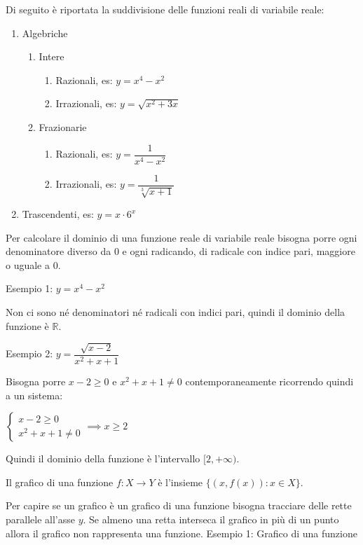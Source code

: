 \documentclass[a4paper]{article}
\theoremstyle{plain}
\theoremstyle{definition}
\theoremstyle{remark}
\newcommand{\R}{\mathbb{R}}
\newcommand{\set}[1]{\{#1\}}
\begin{document}
Di seguito è riportata la suddivisione delle funzioni reali di variabile reale:
\begin{enumerate}
    \item Algebriche
    \begin{enumerate}
        \item Intere
        \begin{enumerate}
            \item Razionali, es: $y=x^4-x^2$
            \item Irrazionali, es: $y=\sqrt{x^2+3x}$
        \end{enumerate}
        \item Frazionarie
        \begin{enumerate}
            \item Razionali, es: $y=\dfrac{1}{x^4-x^2}$
            \item Irrazionali, es: $y=\dfrac{1}{\sqrt[3]{x+1}}$
        \end{enumerate}
    \end{enumerate}
    \item Trascendenti, es: $y=x\cdot 6^x$
\end{enumerate}
Per calcolare il dominio di una funzione reale di variabile reale bisogna porre ogni denominatore diverso da $0$ e ogni radicando, di radicale con indice pari, maggiore o uguale a $0$.

Esempio 1: $y=x^4-x^2$

Non ci sono né denominatori né radicali con indici pari, quindi il dominio della funzione è $\R$.

Esempio 2: $y=\dfrac{\sqrt{x-2}}{x^2+x+1}$

Bisogna porre $x-2\geq0$ e $x^2+x+1\ne0$ contemporaneamente ricorrendo quindi a un sistema:

$\begin{cases}
    x-2\geq0\\
    x^2+x+1\ne0
\end{cases}\implies x\geq2$

Quindi il dominio della funzione è l'intervallo $[2,+\infty)$.

Il grafico di una funzione $f:X\to Y$ è l'insieme $\set{(x,f(x)):x\in X}$.

Per capire se un grafico è un grafico di una funzione bisogna tracciare delle rette parallele all'asse $y$. Se almeno una retta interseca il grafico in più di un punto allora il grafico non rappresenta una funzione.
\newpage
Esempio 1: Grafico di una funzione
\end{document}
